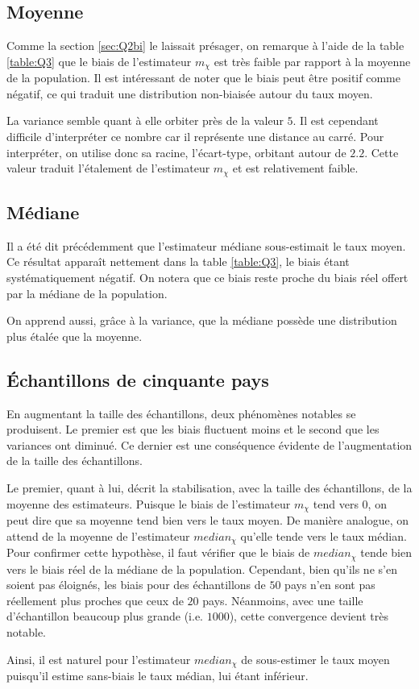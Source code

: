 \documentclass[a4paper, 12pt]{article}
\begin{document}
	\subsection{Moyenne} \label{sec:Q3a}
	Comme la section \ref{sec:Q2bi} le laissait présager, on remarque à l'aide de la table \ref{table:Q3} que le biais de l'estimateur $m_{\chi}$ est très faible par rapport à la moyenne de la population. Il est intéressant de noter que le biais peut être positif comme négatif, ce qui traduit une distribution non-biaisée autour du taux moyen. \par
	La variance semble quant à elle orbiter près de la valeur $5$. Il est cependant difficile d'interpréter ce nombre car il représente une distance \og{}au carré\fg{}. Pour interpréter, on utilise donc sa racine, l'écart-type, orbitant autour de $\num{2.2}$. Cette valeur traduit l'étalement de l'estimateur $m_{\chi}$ et est relativement faible.
	\subsection{Médiane} \label{sec:Q3b}
	Il a été dit précédemment que l'estimateur médiane sous-estimait le taux moyen. Ce résultat apparaît nettement dans la table \ref{table:Q3}, le biais étant systématiquement négatif. On notera que ce biais reste proche du biais réel offert par la médiane de la population. \par
	On apprend aussi, grâce à la variance, que la médiane possède une distribution plus étalée que la moyenne.
	\subsection{Échantillons de cinquante pays} \label{sec:Q3c}
	En augmentant la taille des échantillons, deux phénomènes notables se produisent. Le premier est que les biais fluctuent moins et le second que les variances ont diminué. Ce dernier est une conséquence évidente de l'augmentation de la taille des échantillons. \par
	Le premier, quant à lui, décrit la stabilisation, avec la taille des échantillons, de la moyenne des estimateurs. Puisque le biais de l'estimateur $m_{\chi}$ tend vers $0$, on peut dire que sa moyenne tend bien vers le taux moyen. De manière analogue, on attend de la moyenne de l'estimateur $median_{\chi}$ qu'elle tende vers le taux médian. Pour confirmer cette hypothèse, il faut vérifier que le biais de $median_{\chi}$ tende bien vers le biais réel de la médiane de la population. Cependant, bien qu'ils ne s'en soient pas éloignés, les biais pour des échantillons de $50$ pays n'en sont pas réellement plus proches que ceux de $20$ pays. Néanmoins, avec une taille d'échantillon beaucoup plus grande (i.e. $\num{1000}$), cette convergence devient très notable. \par
	Ainsi, il est naturel pour l'estimateur $median_{\chi}$ de sous-estimer le taux moyen puisqu'il estime sans-biais le taux médian, lui étant inférieur.
\end{document}

